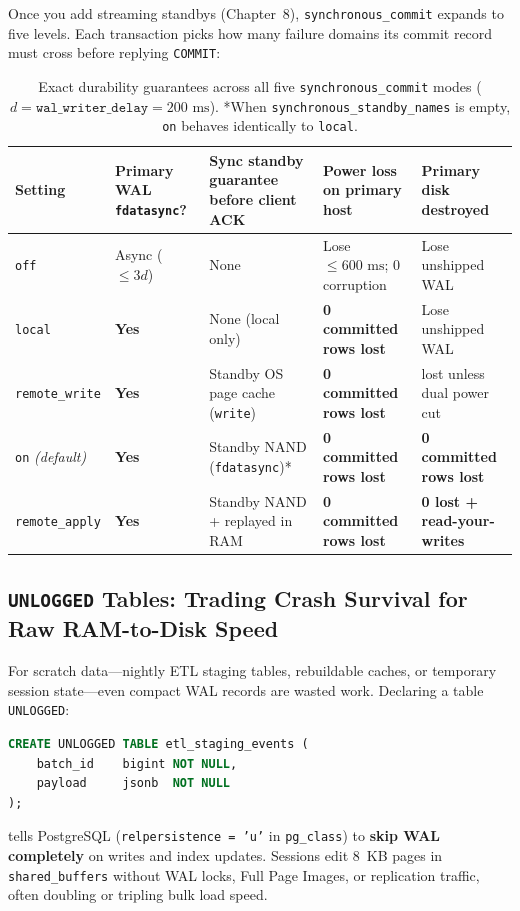 Once you add streaming standbys (Chapter~8), \texttt{synchronous\_commit} expands to five levels. Each transaction picks how many failure domains its commit record must cross before replying \texttt{COMMIT}:

\begin{table}[H]
\centering
\small
\begin{tabular}{@{}>{\raggedright\arraybackslash}p{2.3cm}>{\raggedright\arraybackslash}p{2.1cm}>{\raggedright\arraybackslash}p{3.5cm}>{\raggedright\arraybackslash}p{3.3cm}>{\raggedright\arraybackslash}p{3.3cm}@{}}
\toprule
\textbf{Setting} &
\textbf{Primary WAL \texttt{fdatasync}?} &
\textbf{Sync standby guarantee before client ACK} &
\textbf{Power loss on primary host} &
\textbf{Primary disk destroyed} \\
\midrule
\texttt{off} &
  Async ($\le 3d$) &
  None &
  Lose $\le 600\text{ ms}$; 0 corruption &
  Lose unshipped WAL \\
\texttt{local} &
  \textbf{Yes} &
  None (local only) &
  \textbf{0 committed rows lost} &
  Lose unshipped WAL \\
\texttt{remote\_write} &
  \textbf{Yes} &
  Standby OS page cache (\texttt{write}) &
  \textbf{0 committed rows lost} &
  0 lost unless dual power cut \\
\texttt{on} \emph{(default)} &
  \textbf{Yes} &
  Standby NAND (\texttt{fdatasync})* &
  \textbf{0 committed rows lost} &
  \textbf{0 committed rows lost} \\
\texttt{remote\_apply} &
  \textbf{Yes} &
  Standby NAND + replayed in RAM &
  \textbf{0 committed rows lost} &
  \textbf{0 lost + read-your-writes} \\
\bottomrule
\end{tabular}
\caption{Exact durability guarantees across all five \texttt{synchronous\_commit} modes ($d = \texttt{wal\_writer\_delay} = 200\text{ ms}$). *When \texttt{synchronous\_standby\_names} is empty, \texttt{on} behaves identically to \texttt{local}.}
\label{ch04:tab-sync-commit}
\end{table}

\subsection{\texttt{UNLOGGED} Tables: Trading Crash Survival for Raw RAM-to-Disk Speed}

For scratch data---nightly ETL staging tables, rebuildable caches, or temporary session state---even compact WAL records are wasted work. Declaring a table \texttt{UNLOGGED}:
\begin{lstlisting}[language=SQL]
CREATE UNLOGGED TABLE etl_staging_events (
    batch_id    bigint NOT NULL,
    payload     jsonb  NOT NULL
);
\end{lstlisting}
tells PostgreSQL (\texttt{relpersistence = 'u'} in \texttt{pg\_class}) to \textbf{skip WAL completely} on writes and index updates. Sessions edit 8~KB pages in \texttt{shared\_buffers} without WAL locks, Full Page Images, or replication traffic, often doubling or tripling bulk load speed.

